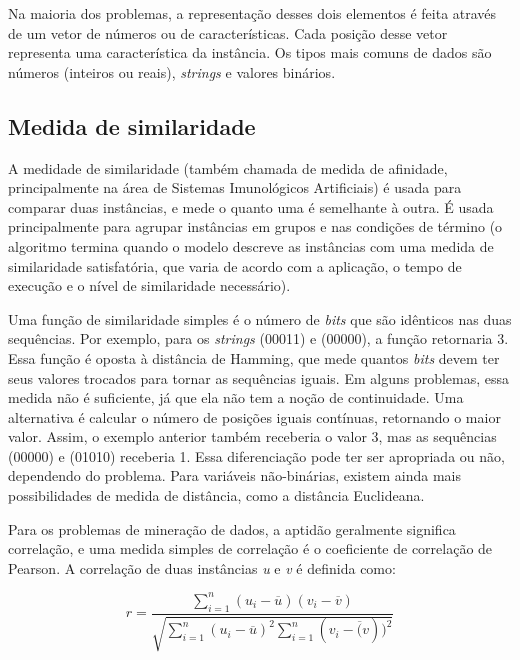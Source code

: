 Na maioria dos problemas, a representação desses dois elementos é feita através de um vetor de números ou de características. Cada posição desse vetor representa uma característica da instância. Os tipos mais comuns de dados são números (inteiros ou reais), \emph{strings} e valores binários.

\subsection{Medida de similaridade}

A medidade de similaridade (também chamada de medida de afinidade, principalmente na área de Sistemas Imunológicos Artificiais) é usada para comparar duas instâncias, e mede o quanto uma é semelhante à outra. É usada principalmente para agrupar instâncias em grupos e nas condições de término (o algoritmo termina quando o modelo descreve as instâncias com uma medida de similaridade satisfatória, que varia de acordo com a aplicação, o tempo de execução e o nível de similaridade necessário).

Uma função de similaridade simples é o número de \emph{bits} que são idênticos nas duas sequências. Por exemplo, para os \emph{strings} (00011) e (00000), a função retornaria 3. Essa função é oposta à distância de Hamming, que mede quantos \emph{bits} devem ter seus valores trocados para tornar as sequências iguais. Em alguns problemas, essa medida não é suficiente, já que ela não tem a noção de continuidade. Uma alternativa é calcular o número de posições iguais contínuas, retornando o maior valor. Assim, o exemplo anterior também receberia o valor 3, mas as sequências (00000) e (01010) receberia 1. Essa diferenciação pode ter ser apropriada ou não, dependendo do problema. Para variáveis não-binárias, existem ainda mais possibilidades de medida de distância, como a distância Euclideana.

Para os problemas de mineração de dados, a aptidão geralmente significa correlação, e uma medida simples de correlação é o coeficiente de correlação de Pearson. A correlação de duas instâncias \emph{u} e \emph{v} é definida como:

\begin{equation}
r=\frac{
    \sum\limits_{i=1}^{n}
        (u_i-\overline{u})
        (v_i-\overline{v})
    }
    {\sqrt{
        \sum\limits_{i=1}^{n}
            (u_i-\overline{u})^2
        \sum\limits_{i=1}^{n}
            (v_i-\overline(v))^2
        }
    }
\end{equation}

